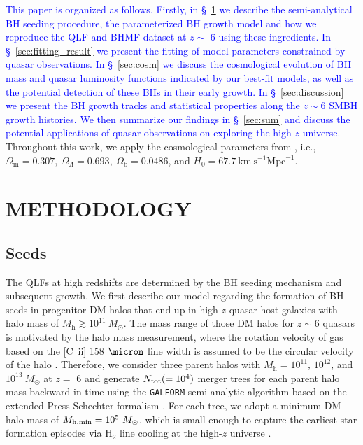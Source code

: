 \documentclass[twocolumn, twocolappendix]{aastex63}
\newcommand{\Msun}{M_\odot}
\newcommand{\Mh}{M_\mathrm{h}}
\newcommand{\blue}[1]{\textcolor{blue}{ #1}}
\begin{document}
\begin{CJK*}{UTF8}{gbsn}
\blue{
This paper is organized as follows. Firstly, in \S~\ref{sec:method} we describe the semi-analytical BH seeding procedure, 
the parameterized BH growth model and how we reproduce the QLF and BHMF dataset at $z\sim$ 6 using these ingredients. 
In \S~\ref{sec:fitting_result} we present the fitting of model parameters constrained by quasar observations.
In \S~\ref{sec:cosm} we discuss the cosmological evolution of BH mass and quasar luminosity functions 
indicated by our best-fit models, as well as the potential detection of these BHs in their early growth.
In \S~\ref{sec:discussion} we present the BH growth tracks and statistical properties along the $z\sim 6$ SMBH growth histories.
We then summarize our findings in \S~\ref{sec:sum} and discuss the potential applications of quasar observations on exploring the high-$z$ universe.
}
Throughout this work, we apply the cosmological parameters from \cite{2016A&A...594A..13P},
i.e., $\Omega_{\mathrm{m}}=0.307,~\Omega_{\Lambda}=0.693,~
\Omega_{\mathrm{b}}=0.0486$, and $H_0=67.7 \mathrm{~km} \mathrm{~s}^{-1} \mathrm{Mpc}^{-1}$.




\vspace{2mm}
\section{METHODOLOGY}\label{sec:method}

\vspace{2mm}
\subsection{Seeds}\label{sec:seed}
The QLFs at high redshifts are determined by the BH seeding mechanism and subsequent growth. 
We first describe our model regarding the formation of BH seeds in progenitor DM halos 
that end up in high-$z$ quasar host galaxies with halo mass of $\Mh \gtrsim 10^{11}~\Msun$.
The mass range of those DM halos for $z\sim 6$ quasars is motivated by the halo mass measurement, 
where the rotation velocity of gas based on the [C~{\sc ii}] 158 $\micron$ line width is assumed to be the circular velocity of the halo
\citep{2002ApJ...578...90F,2013ApJ...773...44W,2019ApJ...872L..29S}.
Therefore, we consider three parent halos with $\Mh = 10^{11}$, $10^{12}$, and $10^{13} ~\Msun$ at $z=$ 6
and generate $N_{\rm tot} (= 10^4)$ merger trees for each parent halo mass backward in time using the {\tt GALFORM} 
semi-analytic algorithm based on the extended Press-Schechter formalism 
\citep{1974ApJ...187..425P,2000MNRAS.319..168C,2008MNRAS.383..557P}.
For each tree, we adopt a minimum DM halo mass of $M_{\rm h,min}=10^5~\Msun$, which is small enough to capture 
the earliest star formation episodes via H$_2$ line cooling at the high-$z$ universe \citep{1996ApJ...464..523H,1997ApJ...474....1T}.



\end{CJK*}
\end{document}
